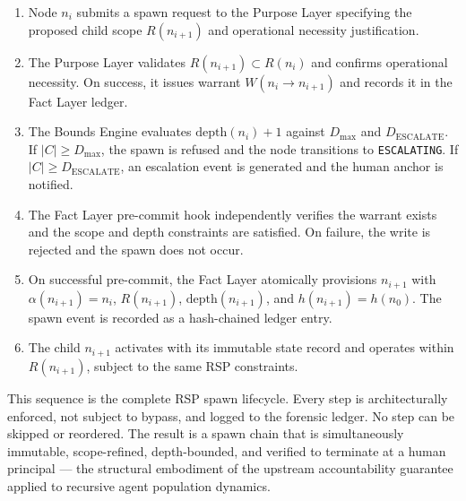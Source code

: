 \begin{enumerate}
    \item Node $n_i$ submits a spawn request to the Purpose Layer specifying the proposed child scope $R(n_{i+1})$ and operational necessity justification.
    \item The Purpose Layer validates $R(n_{i+1}) \subset R(n_i)$ and confirms operational necessity. On success, it issues warrant $W(n_i \to n_{i+1})$ and records it in the Fact Layer ledger.
    \item The Bounds Engine evaluates $\mathrm{depth}(n_i) + 1$ against $D_{\max}$ and $D_{\mathrm{ESCALATE}}$. If $|C| \geq D_{\max}$, the spawn is refused and the node transitions to \texttt{ESCALATING}. If $|C| \geq D_{\mathrm{ESCALATE}}$, an escalation event is generated and the human anchor is notified.
    \item The Fact Layer pre-commit hook independently verifies the warrant exists and the scope and depth constraints are satisfied. On failure, the write is rejected and the spawn does not occur.
    \item On successful pre-commit, the Fact Layer atomically provisions $n_{i+1}$ with $\alpha(n_{i+1}) = n_i$, $R(n_{i+1})$, $\mathrm{depth}(n_{i+1})$, and $h(n_{i+1}) = h(n_0)$. The spawn event is recorded as a hash-chained ledger entry.
    \item The child $n_{i+1}$ activates with its immutable state record and operates within $R(n_{i+1})$, subject to the same RSP constraints.
\end{enumerate}

This sequence is the complete RSP spawn lifecycle. Every step is architecturally enforced, not subject to bypass, and logged to the forensic ledger. No step can be skipped or reordered. The result is a spawn chain that is simultaneously immutable, scope-refined, depth-bounded, and verified to terminate at a human principal --- the structural embodiment of the upstream \bxthree{} accountability guarantee applied to recursive agent population dynamics.

